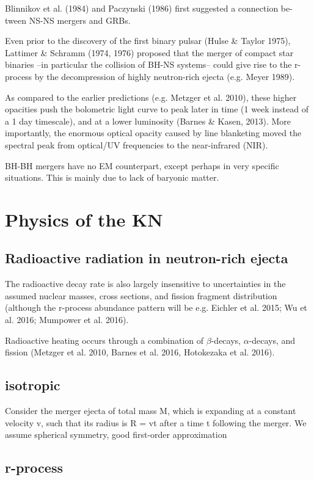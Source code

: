 Blinnikov et al. (1984) and Paczynski (1986) first suggested a connection be- tween NS-NS mergers and GRBs.

Even prior to the discovery of the first binary pulsar (Hulse \& Taylor 1975), Lattimer \& Schramm (1974, 1976) proposed that the merger of compact star binaries --in particular the collision of BH-NS systems-- could give rise to the r-process by the decompression of highly neutron-rich ejecta (e.g. Meyer 1989). 

As compared to the earlier predictions (e.g. Metzger et al. 2010), these higher opacities push the bolometric light curve to peak later in time (1 week instead of a 1 day timescale), and at a lower luminosity (Barnes \& Kasen, 2013). More importantly, the enormous optical opacity caused by line blanketing moved the spectral peak from optical/UV frequencies to the near-infrared (NIR).

BH-BH mergers have no EM counterpart, except perhaps in very specific situations. This is mainly due to lack of baryonic matter.

\section{Physics of the KN}


\subsection{Radioactive radiation in neutron-rich ejecta}

The radioactive decay rate is also largely insensitive to uncertainties in the assumed nuclear masses, cross sections, and fission fragment distribution (although the r-process abundance pattern will be e.g. Eichler et al. 2015; Wu et al. 2016; Mumpower et al. 2016).

Radioactive heating occurs through a combination of $\beta$-decays, $\alpha$-decays, and fission (Metzger et al. 2010, Barnes et al. 2016, Hotokezaka et al. 2016). 

\subsection{isotropic}

Consider the merger ejecta of total mass M, which is expanding at a constant velocity v, such that its radius is R = vt after a time t following the merger. 
We assume spherical symmetry, good first-order approximation

\subsection{r-process}

